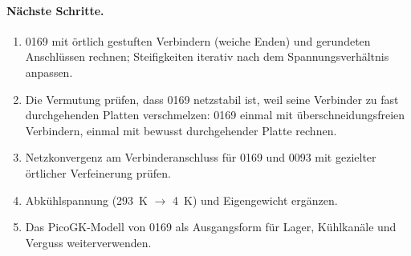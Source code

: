 \paragraph{Nächste Schritte.}
\begin{enumerate}
\item 0169 mit örtlich gestuften Verbindern (weiche Enden) und gerundeten Anschlüssen rechnen; Steifigkeiten
  iterativ nach dem Spannungsverhältnis anpassen.
\item Die Vermutung prüfen, dass 0169 netzstabil ist, weil seine Verbinder zu fast durchgehenden Platten
  verschmelzen: 0169 einmal mit überschneidungsfreien Verbindern, einmal mit bewusst durchgehender Platte rechnen.
\item Netzkonvergenz am Verbinderanschluss für 0169 und 0093 mit gezielter örtlicher Verfeinerung prüfen.
\item Abkühlspannung (\SI{293}{K} $\to$ \SI{4}{K}) und Eigengewicht ergänzen.
\item Das PicoGK-Modell von 0169 als Ausgangsform für Lager, Kühlkanäle und Verguss weiterverwenden.
\end{enumerate}
